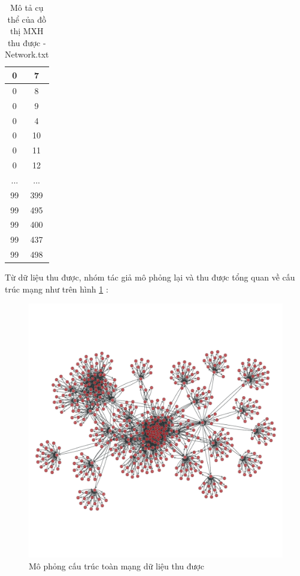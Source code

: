 \begin {itemize}
\begin{table} [!htp]
	\centering
	\begin{tabular}{|c|c|}
		\hline 
		0 & 7 \\ 
		\hline 
		0 & 8 \\ 
		\hline 
		0 & 9 \\ 
		\hline 
		0 & 4 \\ 
		\hline 
		0 & 10 \\ 
		\hline
		0 & 11 \\ 
		\hline
		0 & 12 \\ 
		\hline  
		... & ... \\ 
		\hline 
		99 & 399 \\ 
		\hline 
		99 & 495 \\ 
		\hline 
		99 & 400 \\ 
		\hline 
		99 & 437 \\ 
		\hline 
		99 & 498 \\ 
		\hline 
	\end{tabular}
	\caption{Mô tả cụ thể của đồ thị MXH thu được - Network.txt}
	\label{bang4_2} 
\end{table}

Từ dữ liệu thu được, nhóm tác giả mô phỏng lại và thu được tổng quan về cấu trúc mạng như trên hình \ref{refhinh4_2} :

\begin{center}
	\begin{figure}[htp]
		\begin{center}
			\includegraphics [scale=.6]{picture/Net}
		\end{center}
		\caption{Mô phỏng cấu trúc toàn mạng dữ liệu thu được}
		\label{refhinh4_2}
	\end{figure}
\end{center}
\end {itemize}

